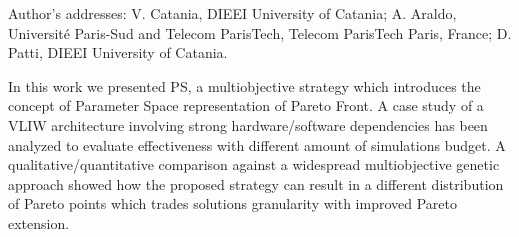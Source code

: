\documentclass[prodmode,acmtecs]{acmsmall}
\newcommand{\secL}[1]{\label{sec:#1}}
\begin{document}




\begin{bottomstuff}
Author's addresses: V. Catania, DIEEI University of Catania;
A. Araldo, Universit\'e Paris-Sud and Telecom ParisTech, Telecom ParisTech
Paris, France;
D. Patti, DIEEI University of Catania.
\end{bottomstuff}

\maketitle





\secL{Conclusions}
In this work we presented PS, a multiobjective strategy which 
introduces the concept of Parameter Space representation of Pareto
Front. A case study of a VLIW architecture involving strong
hardware/software dependencies has been analyzed to evaluate
effectiveness with different amount of simulations budget.
A qualitative/quantitative comparison against a widespread multiobjective genetic
approach showed how the proposed strategy can result in a different
distribution of Pareto points which trades solutions granularity with
improved Pareto extension. 

\balance

 




\end{document}
